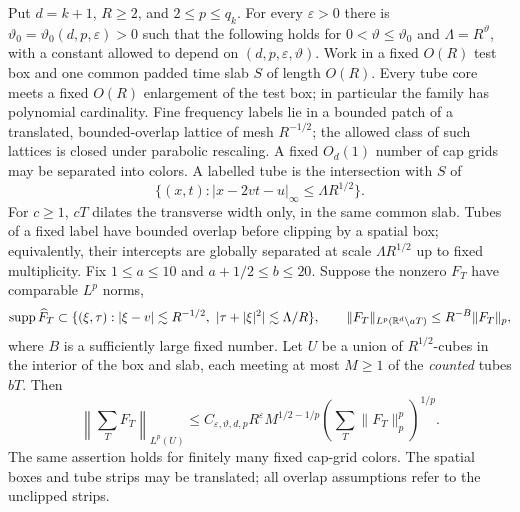 \begin{lemma}\label{p:buffered-refined}
Put $d=k+1$, $R\geq2$, and $2\leq p\leq q_k$.  For every $\varepsilon>0$
there is $\vartheta_0=\vartheta_0(d,p,\varepsilon)>0$ such that the following
holds for $0<\vartheta\leq\vartheta_0$ and
$\Lambda=R^\vartheta$, with a constant allowed to depend on
$(d,p,\varepsilon,\vartheta)$.  Work in a fixed $O(R)$ test box and one common
padded time slab $S$ of length $O(R)$.  Every tube core meets a fixed
$O(R)$ enlargement of the test box; in particular the family has
polynomial cardinality.  Fine frequency labels lie in a
bounded patch of a translated, bounded-overlap lattice of mesh
$R^{-1/2}$; the allowed class of such lattices is closed under parabolic
rescaling.  A fixed $O_d(1)$ number of cap grids may be separated into
colors.  A labelled tube is the intersection with $S$ of
\[
 \{(x,t):|x-2vt-u|_\infty\leq\Lambda R^{1/2}\}.
\]
For $c\geq1$, $cT$ dilates the transverse width only, in the same common
slab.  Tubes of a fixed label have bounded overlap before clipping by a
spatial box; equivalently, their intercepts are globally separated at
scale $\Lambda R^{1/2}$ up to fixed multiplicity.  Fix
$1\leq a\leq10$ and $a+1/2\leq b\leq20$.  Suppose the nonzero $F_T$
have comparable $L^p$ norms,
\[
 \operatorname{supp}\widehat F_T\subset
 \{(\xi,\tau):|\xi-v|\lesssim R^{-1/2},\
              |\tau+|\xi|^2|\lesssim\Lambda/R\},\qquad
 \|F_T\|_{L^p(\mathbb R^d\setminus aT)}\leq R^{-B}\|F_T\|_p,
\]
where $B$ is a sufficiently large fixed number.  Let $U$ be a union of
$R^{1/2}$-cubes in the interior of the box and slab, each meeting at most
$M\geq1$ of the \emph{counted} tubes $bT$.  Then
\begin{equation}\label{p:buffered-equation}
 \left\|\sum_TF_T\right\|_{L^p(U)}
 \leq C_{\varepsilon,\vartheta,d,p}R^\varepsilon
 M^{1/2-1/p}\left(\sum_T\|F_T\|_p^p\right)^{1/p}.
\end{equation}
The same assertion holds for finitely many fixed cap-grid colors.  The
spatial boxes and tube strips may be translated; all overlap assumptions
refer to the unclipped strips.
\end{lemma}
